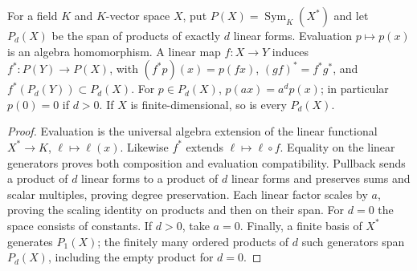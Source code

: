 \begin{lemma}
\label{lem:balanced-intrinsic-polynomials}
\leanok
For a field $K$ and $K$-vector space $X$, put
$P(X)=\operatorname{Sym}_K(X^*)$ and let $P_d(X)$ be the span of products
of exactly $d$ linear forms. Evaluation $p\mapsto p(x)$ is an algebra
homomorphism. A linear map $f:X\to Y$ induces $f^*:P(Y)\to P(X)$,
with $(f^*p)(x)=p(fx)$, $(gf)^*=f^*g^*$, and
$f^*(P_d(Y))\subset P_d(X)$. For $p\in P_d(X)$,
$p(ax)=a^dp(x)$; in particular $p(0)=0$ if $d>0$.
If $X$ is finite-dimensional, so is every $P_d(X)$.
\end{lemma}
\begin{proof}
Evaluation is the universal algebra extension of the linear functional
$X^*\to K$, $\ell\mapsto\ell(x)$. Likewise $f^*$ extends
$\ell\mapsto\ell\circ f$. Equality on the linear generators proves
both composition and evaluation compatibility. Pullback sends a product of
$d$ linear forms to a product of $d$ linear forms and preserves sums and
scalar multiples, proving degree preservation. Each linear factor scales
by $a$, proving the scaling identity on products and then on their span.
For $d=0$ the space consists of constants. If $d>0$, take $a=0$.
Finally, a finite basis of $X^*$ generates $P_1(X)$; the finitely many
ordered products of $d$ such generators span $P_d(X)$, including the
empty product for $d=0$.
\end{proof}

